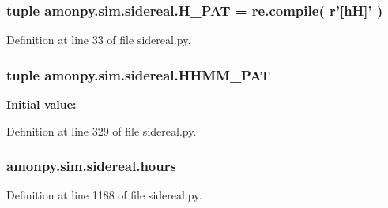 \hypertarget{namespaceamonpy_1_1sim_1_1sidereal_a59cad1b2438b4770cff5fdc5c4b5b729}{
\subsubsection[{H\-\_\-\-P\-A\-T}]{\setlength{\rightskip}{0pt plus 5cm}tuple amonpy.\-sim.\-sidereal.\-H\-\_\-\-P\-A\-T = re.\-compile( r'\mbox{[}h\-H\mbox{]}' )}}\label{namespaceamonpy_1_1sim_1_1sidereal_a59cad1b2438b4770cff5fdc5c4b5b729}


Definition at line 33 of file sidereal.\-py.

\hypertarget{namespaceamonpy_1_1sim_1_1sidereal_aa3d211b997762f17aeda244ab0bf4771}{
\subsubsection[{H\-H\-M\-M\-\_\-\-P\-A\-T}]{\setlength{\rightskip}{0pt plus 5cm}tuple amonpy.\-sim.\-sidereal.\-H\-H\-M\-M\-\_\-\-P\-A\-T}}\label{namespaceamonpy_1_1sim_1_1sidereal_aa3d211b997762f17aeda244ab0bf4771}
{\bfseries Initial value\-:}


Definition at line 329 of file sidereal.\-py.

\hypertarget{namespaceamonpy_1_1sim_1_1sidereal_a8f427c645843461ab5c9c698fa37f43c}{
\subsubsection[{hours}]{\setlength{\rightskip}{0pt plus 5cm}amonpy.\-sim.\-sidereal.\-hours}}\label{namespaceamonpy_1_1sim_1_1sidereal_a8f427c645843461ab5c9c698fa37f43c}


Definition at line 1188 of file sidereal.\-py.

